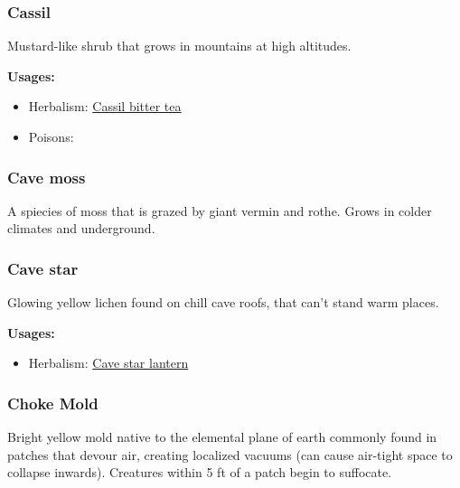\subsubsection{Cassil}
\label{Cassil}

Mustard-like shrub that grows in mountains at high altitudes.

\vspace{5mm}

\textbf{Usages:}

\begin{itemize}[noitemsep]
\item[] Herbalism: \hyperref[Cassil bitter tea]{Cassil bitter tea}
\item[] Poisons: \poison
\end{itemize}

\subsubsection{Cave moss}
\label{Cave moss}

A spiecies of moss that is grazed by giant vermin and rothe. Grows in colder climates and underground.

\subsubsection{Cave star}
\label{Cave Star}

Glowing yellow lichen found on chill cave roofs, that can't stand warm places.

\vspace{5mm}

\textbf{Usages:}

\begin{itemize}[noitemsep]
\item[] Herbalism: \hyperref[Cave star lantern]{Cave star lantern}
\end{itemize}

\subsubsection{Choke Mold}
\label{Choke Mold}

Bright yellow mold native to the elemental plane of earth commonly found in patches that devour air, creating localized vacuums (can cause air-tight space to collapse inwards). Creatures within 5 ft of a patch begin to suffocate.

\vspace{5mm}

